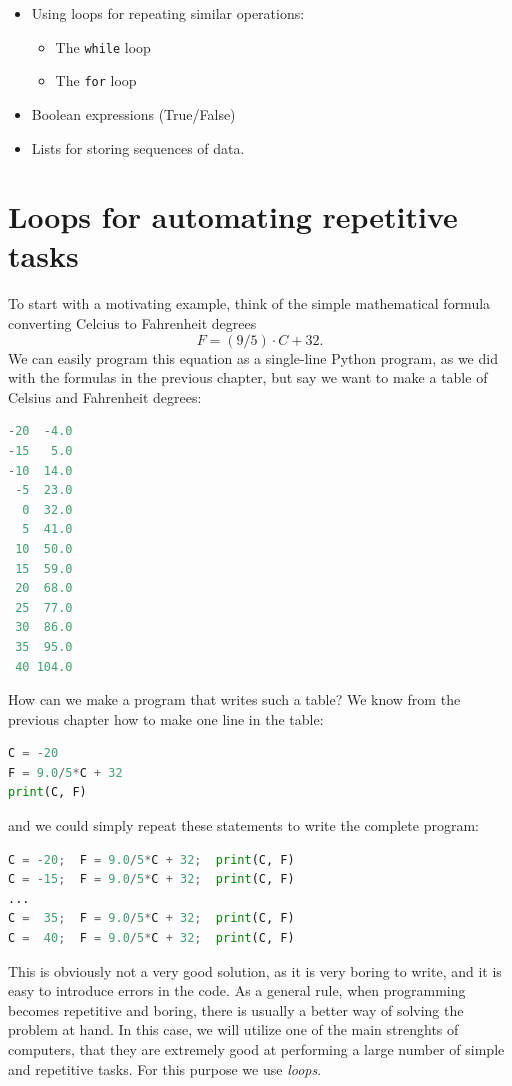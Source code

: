 \documentclass[graybox,envcountchap,sectrefs,final]{svmonodo}
\begin{document}
\begin{itemize}
\item Using loops for repeating similar operations:
\begin{itemize}

  \item The \texttt{while} loop

  \item The \texttt{for} loop

\end{itemize}

\noindent
\item Boolean expressions (True/False)

\item Lists for storing sequences of data.
\end{itemize}

\noindent
\section{Loops for automating repetitive tasks}
To start with a motivating example, think of the simple mathematical formula converting
Celcius to Fahrenheit degrees
\[
F = (9/5)\cdot C+32 .
\]
We can easily program this equation as a single-line Python program, as we did with the formulas
in the previous chapter, but
say we want to make a table of Celsius and Fahrenheit degrees:
\begin{lstlisting}[language=Python,style=blue1]
-20  -4.0
-15   5.0
-10  14.0
 -5  23.0
  0  32.0
  5  41.0
 10  50.0
 15  59.0
 20  68.0
 25  77.0
 30  86.0
 35  95.0
 40 104.0
\end{lstlisting}
How can we make a program that writes such a table? We know from the previous chapter how to
make one line in the table:
\begin{lstlisting}[language=Python,style=blue1]
C = -20
F = 9.0/5*C + 32
print(C, F)
\end{lstlisting}
and we could simply repeat these statements to write the complete program:
\begin{lstlisting}[language=Python,style=blue1]
C = -20;  F = 9.0/5*C + 32;  print(C, F)
C = -15;  F = 9.0/5*C + 32;  print(C, F)
...
C =  35;  F = 9.0/5*C + 32;  print(C, F)
C =  40;  F = 9.0/5*C + 32;  print(C, F)
\end{lstlisting}
This is obviously not a very good solution, as it is very boring to write, and it is easy to introduce errors in the code.
As a general rule, when programming becomes repetitive and boring, there is usually a better way of solving the problem at hand.
In this case, we will utilize one of the main strenghts of computers, that they are extremely good at performing
a large number of simple and repetitive tasks. For this purpose we use \emph{loops}.
\end{document}
